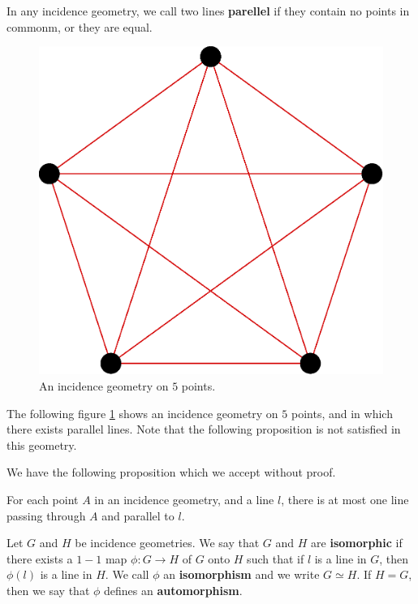 \begin{definition}
    In any incidence geometry, we call two lines \textbf{parellel} if they
    contain no points in commonm, or they are equal.
\end{definition}

\begin{example}\label{1.2}
    \begin{figure}[h]
        \centering
        \includegraphics[scale=0.5]{Figures/Chapter1/incidence_5.eps}
        \caption{An incidence geometry on $5$ points.}
        \label{fig_1.2}
    \end{figure}
    The following figure \ref{fig_1.2} shows an incidence geometry on $5$
    points, and in which there exists parallel lines. Note that the following
    proposition is not satisfied in this geometry.
\end{example}

We have the following proposition which we accept without proof.

\begin{proposition}\label{1.1.2}
    For each point $A$ in an incidence geometry,  and a line $l$, there is at
    most one line passing through  $A$ and parallel to  $l$.
\end{proposition}

\begin{definition}
    Let $G$ and  $H$ be incidence geometries. We say that  $G$ and  $H$ are
     \textbf{isomorphic} if there exists a $1-1$ map  $\phi:G \rightarrow H$ of
     $G$ onto  $H$ such that if $l$ is a line in  $G$, then  $\phi(l)$ is a line
     in $H$. We call $\phi$ an \textbf{isomorphism} and we write $G \simeq H$.
     If $H=G$, then we say that $\phi$ defines an \textbf{automorphism}.
\end{definition}

